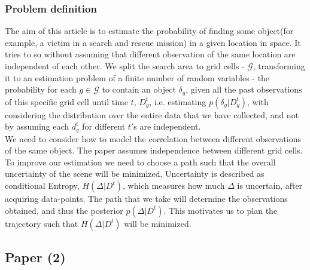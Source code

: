 \documentclass{article}
\begin{document}
	\subsubsection{Problem definition}
	The aim of this article is to estimate the probability of finding some object(for example, a victim in a search and rescue mission) in a given location in space. It tries to so without assuming that different observation of the same location are independent of each other. We split the search area to grid cells - $\mathcal{G}$, transforming it to an estimation problem of a finite number of random variables - the probability for each $g \in \mathcal{G}$ to contain an object $\delta_g$, given all the past observations of this specific grid cell until time $t$, $D_g^t$, i.e. estimating $p(\delta_g|D_g^t)$, with considering the distribution over the entire data that we have collected, and not by assuming each $d^t_g$ for different $t'$s are independent. \\
	
	We need to consider how to model the correlation between different observations of the same object. The paper assumes independence between different grid cells.
	To improve our estimation we need to choose a path such that the overall uncertainty of the scene will be minimized.
	Uncertainty is described as conditional Entropy, $H(\Delta|D^t)$, which measures how much $\Delta$ is uncertain, after acquiring data-points. The path that we take will determine the observations obtained, and thus the posterior $p(\Delta|D^t)$. This motivates us to plan the trajectory such that $H(\Delta|D^t)$ will be minimized.
	
	\subsection{Paper (2)}
\end{document}
